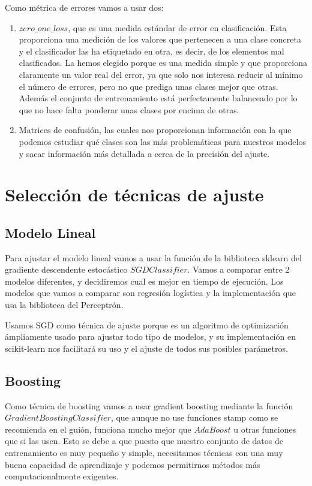 \documentclass{article}
\begin{document}
	Como métrica de errores vamos a usar dos:
	\begin{enumerate}
		\item $zero\_one\_loss$, que es una medida estándar de error en clasificación. Esta proporciona una medición de los valores que pertenecen a una clase concreta y el clasificador las ha etiquetado en otra, es decir, de los elementos mal clasificados. La hemos elegido porque es una medida simple y que proporciona claramente un valor real del error, ya que solo nos interesa reducir al mínimo el número de errores, pero no que prediga unas clases mejor que otras. Además el conjunto de entrenamiento está perfectamente balanceado por lo que no hace falta ponderar unas clases por encima de otras.
		\item Matrices de confusión, las cuales nos proporcionan información con la que podemos estudiar qué clases son las más problemáticas para nuestros modelos y sacar información más detallada a cerca de la precisión del ajuste.
	\end{enumerate}
	
	\section{Selección de técnicas de ajuste}
	
	\subsection{Modelo Lineal}
	Para ajustar el modelo lineal vamos a usar la función de la biblioteca sklearn del gradiente descendente estocástico $SGDClassifier$. Vamos a comparar entre 2 modelos diferentes, y decidiremos cual es mejor en tiempo de ejecución. Los modelos que vamos a comparar son regresión logística y la implementación que usa la biblioteca del Perceptrón.
	\par 
	Usamos SGD como técnica	de ajuste porque es un algoritmo de optimización ámpliamente usado para ajustar todo tipo de modelos, y su implementación en scikit-learn nos facilitará su uso y el ajuste de todos sus posibles parámetros. 
	\subsection{Boosting}
	Como técnica de boosting vamos a usar gradient boosting mediante la función $GradientBoostingClassifier$, que aunque no use funciones stamp como se recomienda en el guión, funciona mucho mejor que $AdaBoost$ u otras funciones que si las usen. Esto se debe a que puesto que nuestro conjunto de datos de entrenamiento es muy pequeño y simple, necesitamos técnicas con una muy buena capacidad de aprendizaje y podemos permitirnos métodos más computacionalmente exigentes. 
\end{document}
